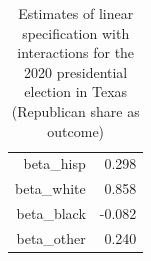 \begin{table}[ht]
\centering
\begin{tabular}{rr}
  \hline
  \hline
beta\_hisp & 0.298 \\ 
  beta\_white & 0.858 \\ 
  beta\_black & -0.082 \\ 
  beta\_other & 0.240 \\ 
   \hline
\end{tabular}
\caption{Estimates of linear specification with interactions for the 2020 presidential election in Texas (Republican share as outcome)} 
\label{tab:int-tex-beta}
\end{table}
